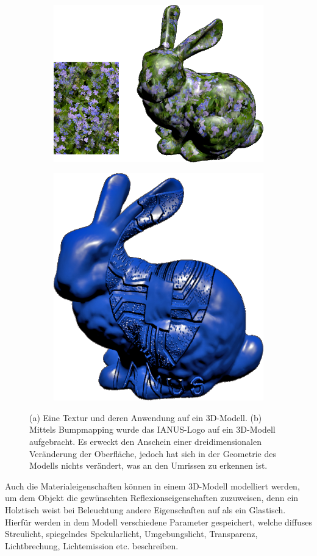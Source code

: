 \begin{figure}
\centering
\begin{subfigure}{.5\textwidth}
  \centering
  \includegraphics[width=.9\linewidth]{bilder/3D_Textur}
  \caption{}
\end{subfigure}%
\begin{subfigure}{.5\textwidth}
  \centering
  \includegraphics[width=.6\linewidth]{bilder/3D_Bump}
  \caption{}
\end{subfigure}
\caption{(a) Eine Textur und deren Anwendung auf ein 3D-Modell. (b) Mittels Bumpmapping wurde das IANUS-Logo auf ein 3D-Modell aufgebracht. Es erweckt den Anschein einer dreidimensionalen Veränderung der Oberfläche, jedoch hat sich in der Geometrie des Modells nichts verändert, was an den Umrissen zu erkennen ist.}
\end{figure}

Auch die Materialeigenschaften können in einem 3D-Modell modelliert werden, um dem Objekt die gewünschten Reflexionseigenschaften zuzuweisen, denn ein Holztisch weist bei Beleuchtung andere Eigenschaften auf als ein Glastisch. Hierfür werden in dem Modell verschiedene Parameter gespeichert, welche diffuses Streulicht, spiegelndes Spekularlicht, Umgebungslicht, Transparenz, Lichtbrechung, Lichtemission etc. beschreiben.

